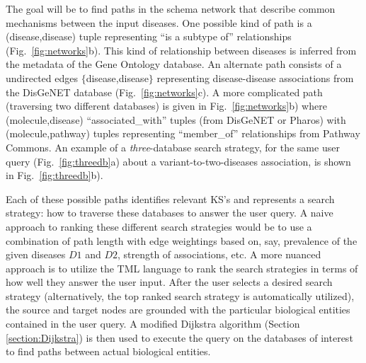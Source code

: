 \documentclass[11pt,notitlepage]{article}
\begin{document}
The goal will be to find paths in the schema network that describe common mechanisms between the input diseases. One possible kind of path is a (disease,disease) tuple representing ``is a subtype of'' relationships (Fig.~\ref{fig:networks}b). This kind of relationship between diseases is inferred from the metadata of the Gene Ontology database. An alternate path consists of a undirected edges $\{$disease,disease$\}$ representing disease-disease associations from the DisGeNET database (Fig.~\ref{fig:networks}c). A more complicated path (traversing two different databases) is given in Fig.~\ref{fig:networks}b) where  (molecule,disease) ``associated\_with'' tuples (from DisGeNET or Pharos) with (molecule,pathway) tuples representing ``member\_of'' relationships from Pathway Commons. An example of a {\em three}-database search strategy, for the same user query (Fig.~\ref{fig:threedb}a) about a variant-to-two-diseases association, is shown in Fig.~\ref{fig:threedb}b).

Each of these possible paths identifies relevant KS's and represents a search strategy: how to traverse these databases to answer the user query. A naive approach to ranking these different search strategies would be to use a combination of path length with edge weightings based on, say, prevalence of the given diseases $D1$ and $D2$,  strength of associations, etc. A more nuanced approach is to utilize the TML language \citet{Domingos:2012wi} to rank the search strategies in terms of how well they answer the user input. After the user selects a desired search strategy (alternatively, the top ranked search strategy is automatically utilized), the source and target nodes are grounded with the particular biological entities contained in the user query. A modified Dijkstra algorithm (Section \ref{section:Dijkstra}) is then used to execute the query on the databases of interest to find paths between actual biological entities.

\end{document}
